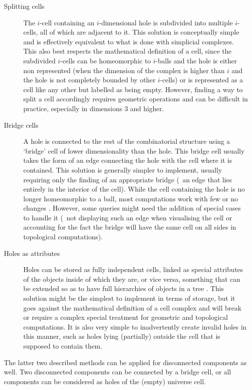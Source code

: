 \begin{description}
\item[Splitting cells]
The $i$-cell containing an $i$-dimensional hole is subdivided into multiple $i$-cells, all of which are adjacent to it.
This solution is conceptually simple and is effectively equivalent to what is done with simplicial complexes.
This also best respects the mathematical definition of a cell, since the subdivided $i$-cells can be homeomorphic to $i$-balls and the hole is either non represented (when the dimension of the complex is higher than $i$ and the hole is not completely bounded by other $i$-cells) or is represented as a cell like any other but labelled as being empty.
However, finding a way to split a cell accordingly requires geometric operations and can be difficult in practice, especially in dimensions 3 and higher.
\item[Bridge cells]
A hole is connected to the rest of the combinatorial structure using a `bridge' cell of lower dimensionality than the hole.
This bridge cell usually takes the form of an edge connecting the hole with the cell where it is contained.
This solution is generally simpler to implement, usually requiring only the finding of an appropriate bridge (\eg\ an edge that lies entirely in the interior of the cell).
While the cell containing the hole is no longer homeomorphic to a ball, most computations work with few or no changes \citep{Bryant85}.
However, some queries might need the addition of special cases to handle it (\eg\ not displaying such an edge when visualising the cell or accounting for the fact the bridge will have the same cell on all sides in topological computations).
\item[Holes as attributes]
Holes can be stored as fully independent cells, linked as special attributes of the objects inside of which they are, or vice versa, something that can be extended so as to have full hierarchies of objects in a tree \citep{Worboys12}.
This solution might be the simplest to implement in terms of storage, but it goes against the mathematical definition of a cell complex and will break or require a complex special treatment for geometric and topological computations.
It is also very simple to inadvertently create invalid holes in this manner, such as holes lying (partially) outside the cell that is supposed to contain them.
\end{description}

The latter two described methods can be applied for disconnected components as well.
Two disconnected components can be connected by a bridge cell, or all components can be considered as holes of the (empty) universe cell.

